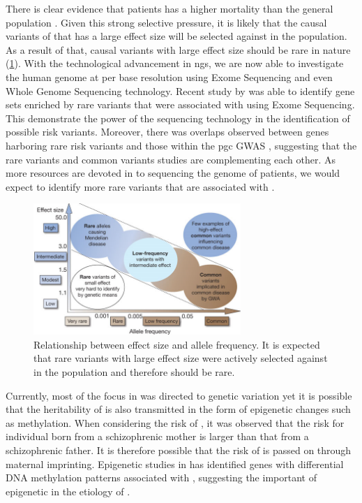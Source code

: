 \documentclass[12pt]{book}
\newcommand*{\glng}{\glsentrylong}
\begin{document}
	There is clear evidence that \glng{scz} patients has a higher mortality than the general population \citep{Saha2007}.
	Given this strong selective pressure, it is likely that the causal variants of \glng{scz} that has a large effect size will be selected against in the population. 
	As a result of that, causal variants with large effect size should be rare in nature (\cref{fig:effectSize}).
	With the technological advancement in \gls{ngs}, we are now able to investigate the human genome at per base resolution using Exome Sequencing and even Whole Genome Sequencing technology.
	Recent study by \citet{Purcell2014} was able to identify gene sets enriched by rare variants that were associated with \glng{scz} using Exome Sequencing. 
	This demonstrate the power of the sequencing technology in the identification of possible risk variants. 
	Moreover, there was overlaps observed between genes harboring rare risk variants and those within the \gls{pgc} \glng{scz} \gls{GWAS} \citep{Purcell2014}, suggesting that the rare variants and common variants studies are complementing each other.
	As more resources are devoted in to sequencing the genome of \glng{scz} patients, we would expect to identify more rare variants that are associated with \glng{scz}.
	\begin{figure}
		\centering
		\includegraphics[width=0.7\textwidth]{figure/maf_effectSize.png}
		\caption[Relationship between Effect Size and Allele Frequency]{
			Relationship between effect size and allele frequency. 
			It is expected that rare variants with large effect size were actively selected against in the population and therefore should be rare.
		}
		\label{fig:effectSize}
	\end{figure}
	
	Currently, most of the focus in \glng{scz} was directed to genetic variation yet it is possible that the heritability of \glng{scz} is also transmitted in the form of epigenetic changes such as methylation.
	When considering the risk of \glng{scz}, it was observed that the risk for individual born from a schizophrenic mother is larger than that from a schizophrenic father. 
	It is therefore possible that the risk of \glng{scz} is passed on through maternal imprinting. 
	Epigenetic studies in \glng{scz} \citep{Wockner2014,Nishioka2012} has identified genes with differential DNA methylation patterns associated with \glng{scz}, suggesting the important of epigenetic in the etiology of \glng{scz}.
	
\end{document}

